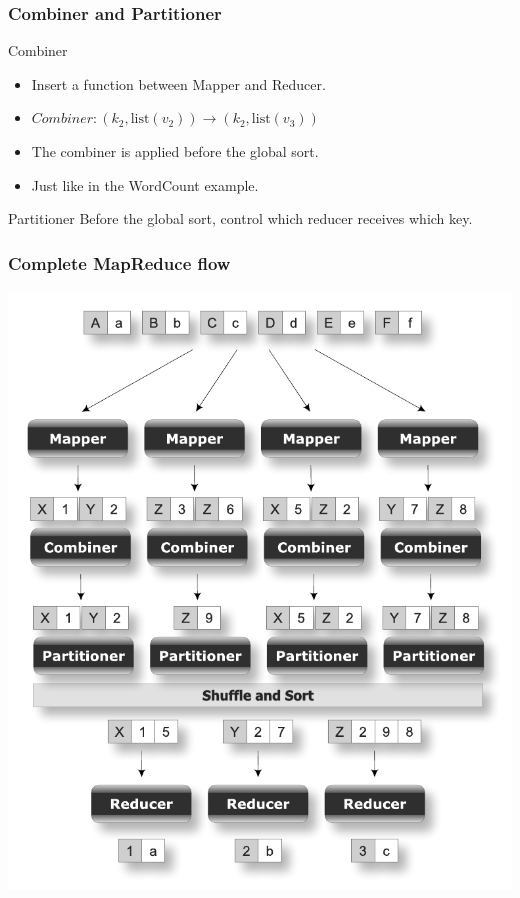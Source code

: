 \begin{frame}
\frametitle{Combiner and Partitioner}
\begin{block}{Combiner}

\begin{itemize}
  \item Insert a function between Mapper and Reducer.
  \item $Combiner: (k_2,\text{list}(v_2)) \rightarrow (k_2,\text{list}(v_3))$ 
  \item The combiner is applied before the global sort.
  \item Just like in the WordCount example.
\end{itemize}
\end{block}

\begin{block}{Partitioner}
  Before the global sort, control which reducer receives which key.
\end{block}
\end{frame}


\begin{frame}
\frametitle{Complete MapReduce flow}
\begin{center}
\includegraphics[scale=0.5,keepaspectratio=true]{figs/12/mapreduce_flow_full.pdf}
\end{center}

\end{frame}

